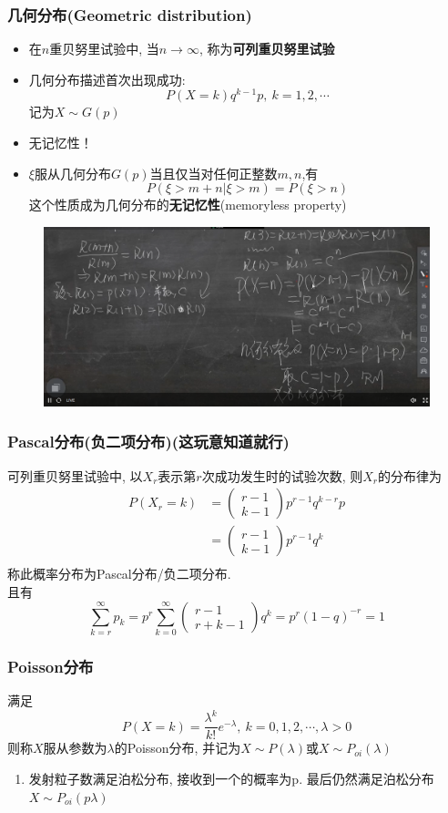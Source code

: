 \documentclass[UTF8]{article}
\newcommand{\itemblt}{\item[$\bullet$]}
\newcommand{\comb}[2]{\left(\begin{array}{c}#1\\#2\end{array}\right)}
\begin{document}
\subsubsection{几何分布(Geometric distribution)}
\begin{itemize}
	\itemblt 在$n$重贝努里试验中, 当$n\rightarrow \infty$, 称为\textbf{可列重贝努里试验}
	\itemblt 几何分布描述首次出现成功:
	$$P(X=k)q^{k-1}p,\ k=1,2,\cdots$$
	记为$X\sim G(p)$
	\itemblt 无记忆性！
	\itemblt $\xi$服从几何分布$G(p)$当且仅当对任何正整数$m,n$,有
	$$P(\xi>m+n|\xi>m)=P(\xi>n)$$
	这个性质成为几何分布的\textbf{无记忆性}(memoryless property)
\end{itemize}
\begin{figure}[H]
	\centering
	\includegraphics[scale=0.4]{2020_3_3_2.png}
\end{figure}\par

\subsubsection{Pascal分布(负二项分布)(这玩意知道就行)}
可列重贝努里试验中, 以$X_r$表示第$r$次成功发生时的试验次数, 则$X_r$的分布律为
\begin{align*}
	P(X_r=k)&=\comb{r-1}{k-1}p^{r-1}q^{k-r}p\\
	&=\comb{r-1}{k-1}p^{r-1}q^{k}\\
\end{align*}
称此概率分布为Pascal分布/负二项分布.\\
且有
$$\sum\limits_{k=r}^{\infty}p_k=p^r\sum\limits_{k=0}^{\infty}\comb{r-1}{r+k-1}q^k=p^r(1-q)^{-r}=1
$$

\subsubsection{Poisson分布}
满足
$$P(X=k)=\frac{\lambda^k}{k!}e^{-\lambda},\ k=0,1,2,\cdots,\lambda>0$$
则称$X$服从参数为$\lambda$的Poisson分布, 并记为$X\sim P(\lambda)$或$X\sim P_{oi}(\lambda)$
\begin{enumerate}
	\item 发射粒子数满足泊松分布, 接收到一个的概率为p. 最后仍然满足泊松分布$X\sim P_{oi}(p\lambda)$
\end{enumerate}
\end{document}
